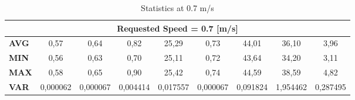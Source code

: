 \begin{table}[H]
{\begin{tabular}{|lcccccccc|}
\multicolumn{9}{|c|}{\textbf{Requested Speed = 0.7 {[}m/s{]}}} \\ \hline
\multicolumn{1}{|l|}{\textbf{AVG}} &
  \multicolumn{1}{c|}{{\color[HTML]{595959} 0,57}} &
  \multicolumn{1}{c|}{{\color[HTML]{595959} 0,64}} &
  \multicolumn{1}{c|}{{\color[HTML]{595959} 0,82}} &
  \multicolumn{1}{c|}{{\color[HTML]{595959} 25,29}} &
  \multicolumn{1}{c|}{{\color[HTML]{595959} 0,73}} &
  \multicolumn{1}{c|}{{\color[HTML]{595959} 44,01}} &
  \multicolumn{1}{c|}{{\color[HTML]{595959} 36,10}} &
  {\color[HTML]{595959} 3,96} \\ \hline
\multicolumn{1}{|l|}{\textbf{MIN}} &
  \multicolumn{1}{c|}{{\color[HTML]{595959} 0,56}} &
  \multicolumn{1}{c|}{{\color[HTML]{595959} 0,63}} &
  \multicolumn{1}{c|}{{\color[HTML]{595959} 0,70}} &
  \multicolumn{1}{c|}{{\color[HTML]{595959} 25,11}} &
  \multicolumn{1}{c|}{{\color[HTML]{595959} 0,72}} &
  \multicolumn{1}{c|}{{\color[HTML]{595959} 43,64}} &
  \multicolumn{1}{c|}{{\color[HTML]{595959} 34,20}} &
  {\color[HTML]{595959} 3,11} \\ \hline
\multicolumn{1}{|l|}{\textbf{MAX}} &
  \multicolumn{1}{c|}{{\color[HTML]{595959} 0,58}} &
  \multicolumn{1}{c|}{{\color[HTML]{595959} 0,65}} &
  \multicolumn{1}{c|}{{\color[HTML]{595959} 0,90}} &
  \multicolumn{1}{c|}{{\color[HTML]{595959} 25,42}} &
  \multicolumn{1}{c|}{{\color[HTML]{595959} 0,74}} &
  \multicolumn{1}{c|}{{\color[HTML]{595959} 44,59}} &
  \multicolumn{1}{c|}{{\color[HTML]{595959} 38,59}} &
  {\color[HTML]{595959} 4,82} \\ \hline
\multicolumn{1}{|l|}{\textbf{VAR}} &
  \multicolumn{1}{c|}{{\color[HTML]{595959} 0,000062}} &
  \multicolumn{1}{c|}{{\color[HTML]{595959} 0,000067}} &
  \multicolumn{1}{c|}{{\color[HTML]{595959} 0,004414}} &
  \multicolumn{1}{c|}{{\color[HTML]{595959} 0,017557}} &
  \multicolumn{1}{c|}{{\color[HTML]{595959} 0,000067}} &
  \multicolumn{1}{c|}{{\color[HTML]{595959} 0,091824}} &
  \multicolumn{1}{c|}{{\color[HTML]{595959} 1,954462}} &
  {\color[HTML]{595959} 0,287495} \\ \hline
\end{tabular}%
}
\caption{Statistics at 0.7 m/s}
\label{tab:speed07test}
\end{table}

